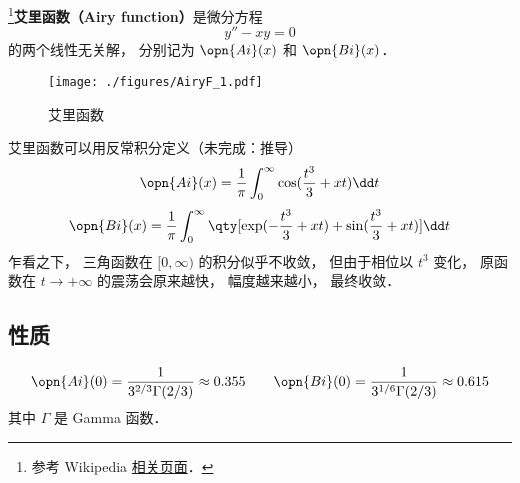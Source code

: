 
\begin{issues}
\issueTODO
\end{issues}


\footnote{参考 Wikipedia \href{https://en.wikipedia.org/wiki/Airy_function}{相关页面}．}\textbf{艾里函数（Airy function）}是微分方程
\begin{equation}
y'' - xy = 0
\end{equation}
的两个线性无关解， 分别记为 $\opn{Ai}(x)$ 和 $\opn{Bi}(x)$．

\begin{figure}[ht]
\centering
\texttt{[image: ./figures/AiryF\_1.pdf]}
\caption{艾里函数} \label{AiryF_fig1}
\end{figure}

艾里函数可以用反常积分定义（未完成：推导）
\begin{equation}
\opn{Ai}(x)=\frac 1\pi \int_0^\infty \cos(\frac{t^3}{3}+xt)\dd t
\end{equation}
\begin{equation}
\opn{Bi}(x)=\frac 1\pi \int_0^\infty \qty[\exp(-\frac{t^3}{3}+xt)+\sin(\frac{t^3}{3}+xt)]\dd t
\end{equation}
乍看之下， 三角函数在 $[0,\infty)$ 的积分似乎不收敛， 但由于相位以 $t^3$ 变化， 原函数在 $t\to+\infty$ 的震荡会原来越快， 幅度越来越小， 最终收敛．


\subsection{性质}
\begin{equation}
\opn{Ai}(0) = \frac{1}{3^{2/3} \Gamma(2/3)} \approx 0.355
\qquad
\opn{Bi}(0) = \frac{1}{3^{1/6} \Gamma(2/3)} \approx 0.615
\end{equation}
其中 $\Gamma$ 是 Gamma 函数．

